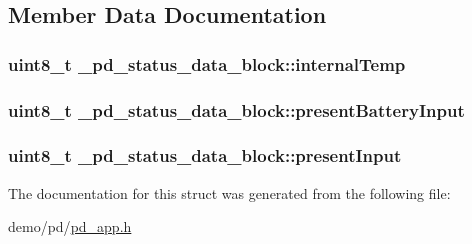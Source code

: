 \subsection{Member Data Documentation}
\hypertarget{struct__pd__status__data__block_a703addd9acd9c9208aee4b610cdcfee0}{
\subsubsection[{internal\-Temp}]{\setlength{\rightskip}{0pt plus 5cm}uint8\-\_\-t \-\_\-pd\-\_\-status\-\_\-data\-\_\-block\-::internal\-Temp}}\label{struct__pd__status__data__block_a703addd9acd9c9208aee4b610cdcfee0}
\hypertarget{struct__pd__status__data__block_a39291ac6c1e754c78545ec755ad12073}{
\subsubsection[{present\-Battery\-Input}]{\setlength{\rightskip}{0pt plus 5cm}uint8\-\_\-t \-\_\-pd\-\_\-status\-\_\-data\-\_\-block\-::present\-Battery\-Input}}\label{struct__pd__status__data__block_a39291ac6c1e754c78545ec755ad12073}
\hypertarget{struct__pd__status__data__block_a73ce40cf713642d43b807c9e6f7c0915}{
\subsubsection[{present\-Input}]{\setlength{\rightskip}{0pt plus 5cm}uint8\-\_\-t \-\_\-pd\-\_\-status\-\_\-data\-\_\-block\-::present\-Input}}\label{struct__pd__status__data__block_a73ce40cf713642d43b807c9e6f7c0915}


The documentation for this struct was generated from the following file\-:\begin{DoxyCompactItemize}
\item 
demo/pd/\hyperlink{pd__app_8h}{pd\-\_\-app.\-h}\end{DoxyCompactItemize}
